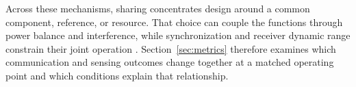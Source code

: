 Across these mechanisms, sharing concentrates design around a common component,
reference, or resource. That choice can couple the functions through power
balance and interference, while synchronization and receiver dynamic range
constrain their joint operation
\cite{OISAC_SCR00013,OISAC_SCR00366}. Section~\ref{sec:metrics} therefore
examines which communication and sensing outcomes change together at a matched
operating point and which conditions explain that relationship.

